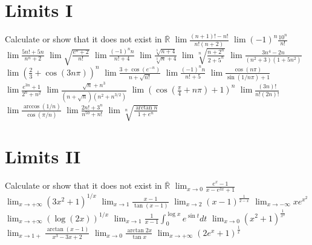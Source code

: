 \documentclass[12pt]{article}
\begin{document}
\section{Limits I}
\begin{ExerciseList}
	\Exercise Calculate or show that it does not exist in $\overline{\mathbb R}$
	\Question $\lim \frac{(n+1)!-n!}{n!(n+2)}$
	\Question $\lim (-1)^n \frac{10^n}{n!}$
	\Question $\lim \frac{5n!+5n}{n^n + 2}$
	\Question $\lim \sqrt{\frac{e^n+2}{n!}}$
	\Question $\lim \frac{(-1)^n n}{n!+4}$
	\Question $\lim \frac{\sqrt[3]{n+4}}{\sqrt[3]{n}+4}$
	\Question $\lim \sqrt[n]{\frac{n+2^n}{2+5^n}}$
	\Question $\lim \frac{3n^4-2n}{(n^2 + 3)(1+5n^2)}$
	\Question $\lim (\frac{2}{3}+\cos(3n\pi))^n$
	\Question $\lim \frac{3+\cos(e^{-n})}{n+\sqrt{n!}}$
	\Question $\lim \frac{(-1)^n n }{n! + 5}$
	\Question $\lim \frac{\cos{(n\pi)}}{\sin{(1/n\pi)}+1}$
	\Question $\lim \frac{e^{3n}+1}{2^n+n^2}$
	\Question $\lim \frac{\sqrt{n} + n^3}{(n+\sqrt{n})(n^2 + n^{3/2})}$
	\Question $\lim (\cos{(\frac{\pi}{4}+n\pi)}+1)^n$
	\Question $\lim \frac{(3n)!}{n!(2n)!}$
	\Question $\lim \frac{\arccos(1/n)}{\cos(\pi/n)}$
	\Question $\lim \frac{2n! + 3^n}{n^{50} + n!}$
	\Question $\lim \sqrt[n]{\frac{\arctan n}{1+e^n}}$
\end{ExerciseList}

\section{Limits II}
\begin{ExerciseList}
	\Exercise Calculate or show that it does not exist in $\overline{\mathbb R}$
	\Question $\lim_{x\to 0}\frac{e^x - 1}{x-e^{3x} + 1}$
	\Question $\lim_{x\to +\infty}(3x^2+1)^{1/x}$
	\Question $\lim_{x\to 1}\frac{x-1}{\tan(x-1)}$
	\Question $\lim_{x\to 2}(x-1)^{\frac{1}{2-x}}$
	\Question $\lim_{x\to -\infty}xe^{x^2}$
	\Question $\lim_{x\to +\infty}(\log(2x))^{1/x}$
	\Question $\lim_{x\to 1}\frac{1}{x-1}\int_0^{\log x}{e^{\sin t}}dt$
	\Question $\lim_{x\to 0}(x^2 + 1)^{\frac{1}{x^2}}$
	\Question $\lim_{x\to1+}\frac{\arctan(x-1)}{x^3-3x+2}$
	\Question $\lim_{x\to 0}\frac{\arctan{2x}}{\tan x}$
	\Question $\lim_{x\to +\infty}(2e^x + 1)^{\frac{1}{x}}$
\end{ExerciseList}
\end{document}
